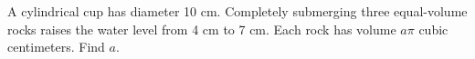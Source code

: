 A cylindrical cup has diameter 10 cm. Completely submerging three equal-volume rocks raises the water level from 4 cm to 7 cm. Each rock has volume $ a\pi $ cubic centimeters. Find $ a $.
